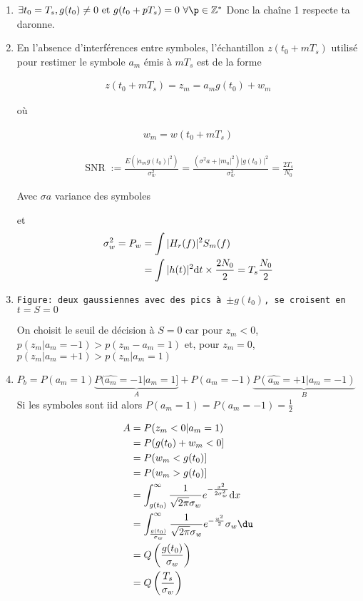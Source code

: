 \documentclass{article}
\begin{document}
\begin{enumerate}
    \item $\exists t_0 = T_s, g(t_0) \neq 0 \text{ et } g(t_0 + pT_s) = 0 \ \forall \p\in \Z^\ast$
        Donc la chaîne 1 respecte ta daronne.
    \item En l'absence d'interférences entre symboles, l'échantillon $z(t_0+mT_s)$ utilisé pour restimer le symbole $a_m$ émis à $mT_s$ est de la forme

         \begin{align*}
            z(t_0+mT_s) = z_m  = a_m g(t_0) + w_m
        \end{align*}

        où 

        \begin{align*}
            w_m = w(t_0 + mT_s)
        \end{align*}

        \begin{align*}
            \operatorname{SNR} := \frac{E(|a_mg(t_0)|^2)}{\sigma_w^2} = \frac{(\sigma^2a + |m_a|^2) |g(t_0)|^2}{\sigma_w^2} = \frac{2T_s}{N_0}
        \end{align*}

        Avec $\sigma a$ variance des symboles

        et 
\begin{align*}
    \sigma_w^2 = P_w &= \int |H_r(f)|^2 S_m(f)  \\
    &= \int |h(t)|^2 \mathrm{d}t  \times \frac{2N_0}{2} = T_s \frac{N_0}{2}  \\
\end{align*}

\item 

\texttt{Figure: deux gaussiennes avec des pics à $\pm g(t_0)$, se croisent en $t=S=0$}

On choisit le seuil de décision à $S=0$ car pour $z_m < 0$, $p(z_m | a_m = -1) > p(z_m - a_m = 1)$ et, pour $z_m = 0$, $p(z_m | a_m = +1) > p(z_m | a_m = 1)$

\item $P_b = P(a_m = 1) \underbrace{P(\hat{a_m} = -1 | a_m = 1]}_A + P(a_m = -1) \underbrace{P(\hat{a_m} = +1 | a_m = -1)}_B$
    Si les symboles sont iid alors $P(a_m = 1) = P(a_m = -1) = \frac{1}{2}$

    \begin{align*}
        A &= P(z_m < 0 | a_m = 1) \\
          &= P(g(t_0) + w_m < 0 ] \\
          &= P(w_m < g(t_0)]  \\
          &= P(w_m > g(t_0)] \\
          &= \int_{g(t_0)}^{\infty} \frac{1}{\sqrt{2 \pi} \sigma_w} e^{- \frac{x^2}{2 \sigma_w^2}} \dx \\
          &= \int_{\frac{g(t_0)}{\sigma_w}}^{\infty} \frac{1}{\sqrt{2 \pi} \sigma_w} e^{-\frac{u^2}{2}} \sigma_w \du \\
          &= Q\left( \frac{g(t_0)}{\sigma_w} \right)  \\
          &= Q\left( \frac{T_s}{\sigma_w} \right)  \\
    \end{align*}


\end{enumerate}
\end{document}
